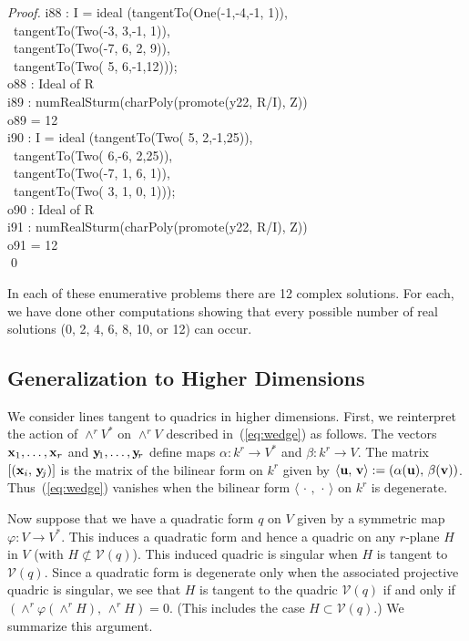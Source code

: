 \begin{proof}
\beginOutput
i88 : I = ideal (tangentTo(One(-1,-4,-1, 1)),\\
\                 tangentTo(Two(-3, 3,-1, 1)),  \\
\                 tangentTo(Two(-7, 6, 2, 9)), \\
\                 tangentTo(Two( 5, 6,-1,12)));\\
\emptyLine
o88 : Ideal of R\\
\endOutput
%
\beginOutput
i89 : numRealSturm(charPoly(promote(y22, R/I), Z))\\
\emptyLine
o89 = 12\\
\endOutput
%
\beginOutput
i90 : I = ideal (tangentTo(Two( 5, 2,-1,25)), \\
\                 tangentTo(Two( 6,-6, 2,25)), \\
\                 tangentTo(Two(-7, 1, 6, 1)), \\
\                 tangentTo(Two( 3, 1, 0, 1)));\\
\emptyLine
o90 : Ideal of R\\
\endOutput
%
\beginOutput
i91 : numRealSturm(charPoly(promote(y22, R/I), Z))\\
\emptyLine
o91 = 12\\
\endOutput
%
\qed
\end{proof}


In each of these enumerative problems there are 12 complex solutions.
For each, we have done other computations  showing that every possible
number of real solutions (0, 2, 4, 6, 8, 10, or 12) can occur.



\subsection{Generalization to Higher Dimensions}
We consider lines tangent to quadrics in higher dimensions.
First, we reinterpret the action of $\wedge^rV^*$ on $\wedge^rV$
described in~(\ref{eq:wedge}) as follows.
The vectors ${\bf x}_1,\ldots,{\bf x}_r$ and ${\bf y}\!_1,\ldots,{\bf y}\!_r$ 
define maps $\alpha\colon k^r\to V^*$ and $\beta\colon k^r\to V$.
The matrix $[({\bf x}_i,\,{\bf y}\!_j)]$ is the matrix of the bilinear form
on $k^r$ given by 
$\langle{\bf u},\,{\bf v}\rangle:= (\alpha({\bf u}),\,\beta({\bf v}))$.
Thus~(\ref{eq:wedge}) vanishes when the bilinear form 
$\langle\,\cdot\,,\,\cdot\,\rangle$ on $k^r$ is degenerate.

Now suppose that we have a quadratic form $q$ on $V$ given by a symmetric map 
$\varphi\colon V\to V^*$.
This induces a quadratic form and hence a quadric on any $r$-plane $H$ in $V$ 
(with $H\not\subset{\mathcal V}(q)$).
This induced quadric is singular when $H$ is tangent to ${\mathcal V}(q)$.
Since a quadratic form is degenerate only when the associated projective
quadric is singular, we see that
$H$ is tangent to the quadric
${\mathcal V}(q)$ if and only if 
$(\wedge^r\varphi(\wedge^rH),\,\wedge^rH)=0$.
(This includes the case $H\subset{\mathcal V}(q)$.)
We summarize this argument.


